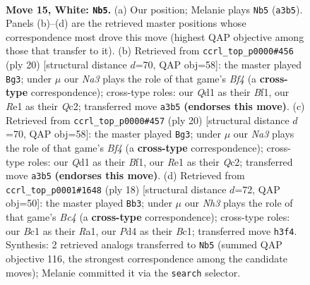 \documentclass[11pt]{article}
\begin{document}
\clearpage

\begin{figure}[p]\centering
\begin{subfigure}{0.46\textwidth}\centering
\resizebox{\linewidth}{!}{%
\newchessgame
\chessboard[
  setfen={r2qk2r/ppp1b3/nn3pp1/3p1b1p/P2P4/NB5N/RPP2PPP/2BQR1K1 w kq - 6 15},
  showmover=false,
  pgfstyle=straightmove, color=movearrow, markmove={a3-b5}
]}
\caption{}
\end{subfigure}\hfill
\begin{subfigure}{0.46\textwidth}\centering
\resizebox{\linewidth}{!}{%
\newchessgame
\chessboard[
  setfen={r2qk2r/pb1p1ppp/1p2pnn1/2b5/2P2B2/P1N1PN2/1PQ2PPP/3RKB1R w Kkq - 1 11},
  showmover=false,
  pgfstyle=straightmove, color=movearrow, markmove={f4-g3}
]}
\caption{}
\end{subfigure}
\\[4pt]
\begin{subfigure}{0.46\textwidth}\centering
\resizebox{\linewidth}{!}{%
\newchessgame
\chessboard[
  setfen={r2qk2r/pb1p1ppp/1p2pnn1/2b5/2P2B2/P1N1PN2/1PQ2PPP/3RKB1R w Kkq - 1 11},
  showmover=false,
  pgfstyle=straightmove, color=movearrow, markmove={f4-g3}
]}
\caption{}
\end{subfigure}\hfill
\begin{subfigure}{0.46\textwidth}\centering
\resizebox{\linewidth}{!}{%
\newchessgame
\chessboard[
  setfen={2rqkb1r/1p3ppp/p1npbn2/4p3/2B1P3/2NQ1N2/PPP2PPP/R1B2RK1 w k - 4 10},
  showmover=false,
  pgfstyle=straightmove, color=movearrow, markmove={c4-b3}
]}
\caption{}
\end{subfigure}
\caption{\textbf{Move 15, White: \texttt{Nb5}.} (a) Our position; Melanie plays \texttt{Nb5} (\texttt{a3b5}). Panels (b)--(d) are the retrieved master positions whose correspondence most drove this move (highest QAP objective among those that transfer to it). (b) Retrieved from \texttt{ccrl\_top\_p0000\#456} (ply 20) [structural distance $d$=70, QAP obj=58]: the master played \texttt{Bg3}; under $\mu$ our \emph{Na3} plays the role of that game's \emph{Bf4} (a \textbf{cross-type} correspondence); cross-type roles: our \emph{Q}d1 as their \emph{B}f1, our \emph{R}e1 as their \emph{Q}c2; transferred move \texttt{a3b5} \textbf{(endorses this move)}. (c) Retrieved from \texttt{ccrl\_top\_p0000\#457} (ply 20) [structural distance $d$=70, QAP obj=58]: the master played \texttt{Bg3}; under $\mu$ our \emph{Na3} plays the role of that game's \emph{Bf4} (a \textbf{cross-type} correspondence); cross-type roles: our \emph{Q}d1 as their \emph{B}f1, our \emph{R}e1 as their \emph{Q}c2; transferred move \texttt{a3b5} \textbf{(endorses this move)}. (d) Retrieved from \texttt{ccrl\_top\_p0001\#1648} (ply 18) [structural distance $d$=72, QAP obj=50]: the master played \texttt{Bb3}; under $\mu$ our \emph{Nh3} plays the role of that game's \emph{Bc4} (a \textbf{cross-type} correspondence); cross-type roles: our \emph{B}c1 as their \emph{R}a1, our \emph{P}d4 as their \emph{B}c1; transferred move \texttt{h3f4}. Synthesis: 2 retrieved analogs transferred to \texttt{Nb5} (summed QAP objective 116, the strongest correspondence among the candidate moves); Melanie committed it via the \texttt{search} selector.}
\label{fig:thought-m28}
\end{figure}
\end{document}
